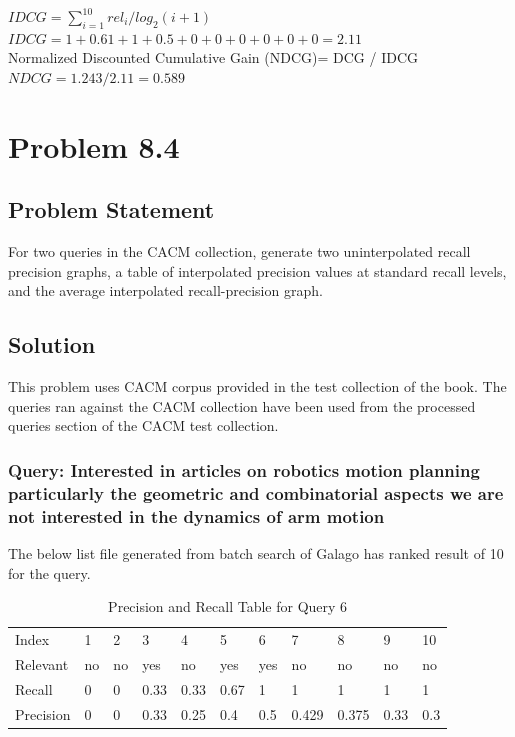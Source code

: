 \documentclass[12pt]{report}
\begin{document}
$IDCG = \sum\limits_{i=1}^{10} rel_i / log_2(i + 1)$ \\
$IDCG = 1 + 0.61 + 1 + 0.5 + 0 + 0 + 0 + 0 + 0 + 0 =  2.11$\\
Normalized Discounted Cumulative Gain (NDCG)=  DCG / IDCG\\
$NDCG = 1.243 / 2.11 = 0.589$

\chapter{Problem 8.4}
\section{Problem Statement}
For two queries in the CACM collection, generate two uninterpolated recall precision graphs, a table of interpolated precision values at standard recall levels, and the average interpolated recall-precision graph.
\section{Solution}
This problem uses CACM corpus provided in the test collection of the book. The queries ran against the CACM collection have been used from the processed queries section of the CACM test collection.\\
\subsection{Query: Interested in articles on robotics motion planning particularly the geometric and combinatorial aspects we are not interested in the dynamics of arm motion}

The below list file generated from batch search of Galago has ranked result of 10 for the query.


\begin{table}[]
\centering
\caption{Precision and Recall Table for Query 6}
\label{my-label}
\begin{tabular}{lllllllllll}
Index     & 1    & 2    & 3    & 4   & 5   & 6    & 7     & 8     & 9    & 10  \\
Relevant  & no  & no   & yes   & no & yes  & yes   & no   & no    & no   & no \\
Recall    & 0 & 0 & 0.33 & 0.33 & 0.67 & 1  & 1  & 1  & 1 & 1   \\
Precision & 0  & 0  & 0.33 & 0.25 & 0.4 & 0.5 & 0.429 & 0.375 & 0.33 & 0.3
\end{tabular}
\end{table}
\end{document}
